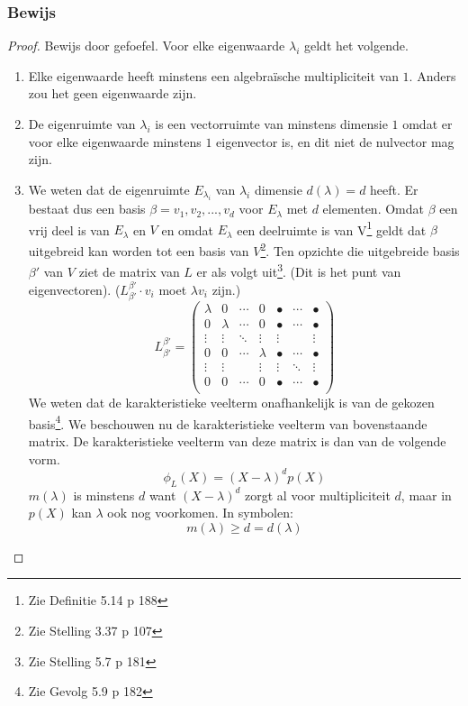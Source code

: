 \documentclass[lineaire_algebra_oplossingen.tex]{subfiles}
\begin{document}
\subsubsection*{Bewijs}
\begin{proof}
Bewijs door gefoefel.
Voor elke eigenwaarde $\lambda_i$ geldt het volgende.
\begin{enumerate}
\item Elke eigenwaarde heeft minstens een algebra\"ische multipliciteit van $1$. Anders zou het geen eigenwaarde zijn.

\item De eigenruimte van $\lambda_i$ is een vectorruimte van minstens dimensie $1$ omdat er voor elke eigenwaarde minstens $1$ eigenvector is, en dit niet de nulvector mag zijn.

\item
We weten dat de eigenruimte $E_{\lambda_i}$ van $\lambda_i$ dimensie $d(\lambda) = d$ heeft. Er bestaat dus een basis $\beta = v_1,v_2,...,v_d$ voor $E_\lambda$ met $d$ elementen. Omdat $\beta$ een vrij deel is van $E_\lambda$ en $V$ en omdat $E_\lambda$ een deelruimte is van V\footnote{Zie Definitie 5.14 p 188} geldt dat $\beta$ uitgebreid kan worden tot een basis van $V$\footnote{Zie Stelling 3.37 p 107}. Ten opzichte die uitgebreide basis $\beta'$ van $V$ ziet de matrix van $L$ er als volgt uit\footnote{Zie Stelling 5.7 p 181}. (Dit is het punt van eigenvectoren). ($L_{\beta'}^{\beta'}\cdot v_i$ moet $\lambda v_i$ zijn.)
\[
L_{\beta'}^{\beta'} = 
\begin{pmatrix}
\lambda & 0 & \cdots & 0 & \bullet & \cdots & \bullet\\
0 & \lambda & \cdots & 0 & \bullet & \cdots & \bullet\\
\vdots & \vdots & \ddots & \vdots & \vdots & &  \vdots\\
0 & 0 & \cdots & \lambda & \bullet & \cdots & \bullet\\
\vdots & \vdots & & \vdots & \vdots & \ddots & \vdots\\
0 & 0 &\cdots & 0 & \bullet & \cdots & \bullet\\
\end{pmatrix}
\]
We weten dat de karakteristieke veelterm onafhankelijk is van de gekozen basis\footnote{Zie Gevolg 5.9 p 182}. We beschouwen nu de karakteristieke veelterm van bovenstaande matrix.
De karakteristieke veelterm van deze matrix is dan van de volgende vorm. 
\[
\phi_L(X) = (X-\lambda)^dp(X)
\]
$m(\lambda)$ is minstens $d$ want $(X-\lambda)^d$ zorgt al voor multipliciteit $d$, maar in $p(X)$ kan $\lambda$ ook nog voorkomen. In symbolen:
\[
m(\lambda) \ge d = d(\lambda)
\]
\end{enumerate}
\end{proof}
\end{document}
